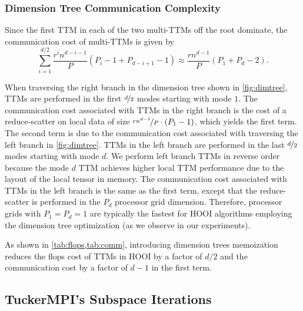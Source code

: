     \subsubsection{Dimension Tree Communication Complexity} \label{sec:Dimension Tree Communication Complexity}

        Since the first TTM in each of the two multi-TTMs off the root dominate,
        the communication cost of multi-TTMs is given by
        \begin{equation*}
            \sum_{i=1}^{d/2}  \frac{r^in^{d-i-1}}{P}\left(P_i - 1 + P_{d-i+1} - 1\right) \approx   \frac{rn^{d-1}}{P} \left(P_1 + P_d - 2\right).
        \end{equation*}
        
        When traversing the right branch in the dimension tree shown in
        \cref{fig:dimtree}, TTMs are performed in the first $\nicefrac d2$ modes
        starting with mode $1$. The communication cost associated with TTMs in
        the right branch is the cost of a reduce-scatter on local data of size
        $\nicefrac{rn^{d-1}}{P}\cdot(P_1-1)$, which yields the first term. The
        second term is due to the communication cost associated with traversing
        the left branch in \cref{fig:dimtree}. TTMs in the left branch are
        performed in the last $\nicefrac d2$ modes starting with mode $d$. We
        perform left branch TTMs in reverse order because the mode $d$ TTM
        achieves higher local TTM performance due to the layout of the local
        tensor in memory. The communication cost associated with TTMs in the
        left branch is the same as the first term, except that the
        reduce-scatter is performed in the $P_d$ processor grid dimension.
        Therefore, processor grids with $P_1 = P_d = 1$ are typically the
        fastest for HOOI algorithms employing the dimension tree optimization
        (as we observe in our experiments).

        As shown in \cref{tab:flops,tab:comm}, introducing dimension trees
        memoization reduces the flops cost of TTMs in HOOI by a factor of $d/2$
        and the communication cost by a factor of $d-1$ in the first term.


\subsection{TuckerMPI's Subspace Iterations} \label{TuckerMPI's Subspace Iterations}

